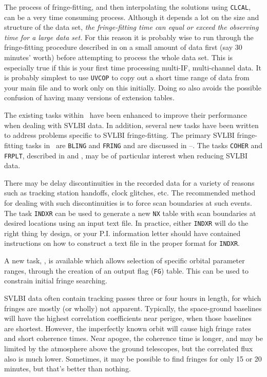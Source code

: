 The process of fringe-fitting, and then interpolating the solutions
using {\tt CLCAL}, can be a very time consuming process.  Although it
depends a lot on the size and structure of the data set, {\it the
fringe-fitting time can equal or exceed the observing time for a large
data set.}  For this reason it is probably wise to run through the
fringe-fitting procedure described in  on a small amount
of data first (say 30 minutes' worth) before attempting to process the
whole data set.  This is especially true if this is your first time
processing multi-IF, multi-channel  data.  It is probably
simplest to use {\tt UVCOP} to copy out a short time range of data
from your main file and to work only on this initially.  Doing so also
avoids the possible confusion of having many versions of extension
tables.


The existing  tasks within \AIPS\ have been
enhanced to improve their performance when dealing with SVLBI data. In
addition, several new tasks have been written to address problems
specific to SVLBI fringe-fitting.  The primary SVLBI fringe-fitting
tasks in \AIPS\ are {\tt BLING} and {\tt FRING} and are discussed in
--\@.  The tasks {\tt COHER} and {\tt FRPLT},
described in  and , may be of particular
interest when reducing SVLBI data.

There may be delay discontinuities in the recorded data for a variety
of reasons such as tracking station handoffs, clock glitches, etc.
The recommended method for dealing with such discontinuities is to
force scan boundaries at such events.  The task {\tt INDXR} can be
used to generate a new {\tt NX} table with scan boundaries at desired
locations using an input text file.  In practice, either {\tt INDXR}
will do the right thing by design, or your P.I. information letter
should have contained instructions on how to construct a text file in
the proper format for {\tt INDXR}\@.

A new task, {\tt {}}, is available which allows selection of
specific orbital parameter ranges, through the creation of an output
flag ({\tt FG}) table.  This can be used to constrain initial fringe
searching.

SVLBI data often contain tracking passes three or four hours in
length, for which fringes are mostly (or wholly) not apparent.
Typically, the space-ground baselines will have the highest
correlation coefficients near perigee, when those baselines are
shortest.  However, the imperfectly known orbit will cause high fringe
rates and short coherence times.  Near apogee, the coherence time is
longer, and may be limited by the atmosphere above the ground
telescopes, but the correlated flux also is much lower.  Sometimes, it
may be possible to find fringes for only 15 or 20 minutes, but that's
better than nothing.

